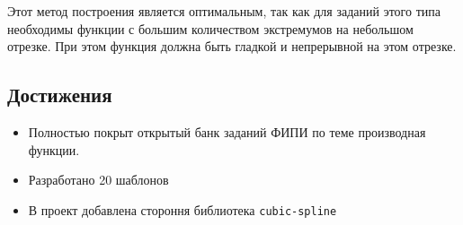 \documentclass[a4paper, 12pt]{extarticle}
\begin{document}
Этот метод построения является оптимальным, так как для заданий этого типа необходимы функции с большим количеством экстремумов на небольшом отрезке. При этом функция должна быть гладкой и непрерывной на этом отрезке.  

\subsection*{Достижения}
\begin{itemize}
    \item Полностью покрыт открытый банк заданий ФИПИ по теме производная функции.
    \item Разработано 20 шаблонов
    \item В проект добавлена стороння библиотека \texttt{cubic-spline}
\end{itemize}
\end{document}
